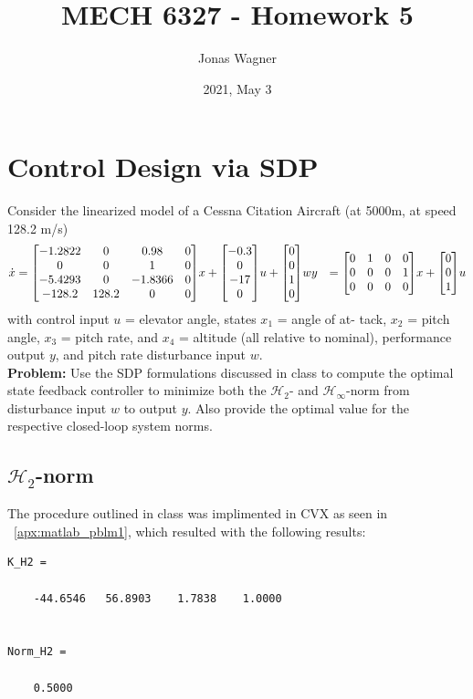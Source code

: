 \documentclass[letter]{article}
\title{MECH 6327 - Homework 5}
\author{Jonas Wagner}
\date{2021, May 3}
\begin{document}
\maketitle

\tableofcontents

\newpage
\section{Control Design via SDP}
Consider the linearized model of a Cessna Citation Aircraft (at 5000m, at speed 128.2 m/s)
\begin{equation}
	\begin{aligned}
		\dot{x} &= \mqty[-1.2822 & 0 & 0.98 &0\\
						 0 & 0 &1 &0\\
						 -5.4293 &0 &-1.8366 &0\\
						 -128.2 &128.2 &0 &0] x
				+ \mqty[-0.3\\ 0\\ -17\\ 0] u
				+ \mqty[0\\ 0\\ 1\\0]w
		y		&= \mqty[0&1&0&0\\ 0&0&0&1\\ 0&0&0&0] x
				+ \mqty[0\\0\\1]u	
	\end{aligned}
\end{equation}
with control input $u$ = elevator angle, states $x_1$ = angle of at-
tack, $x_2$ = pitch angle, $x_3$ = pitch rate, and $x_4$ = altitude (all
relative to nominal), performance output $y$, and pitch rate disturbance input $w$.\\

\noindent
\textbf{Problem:}
Use the SDP formulations discussed in class to compute the optimal state feedback controller to minimize both the $\mathcal{H}_2$- and $\mathcal{H}_\infty$-norm from disturbance input $w$ to output $y$.
Also provide the optimal value for the respective closed-loop system norms.

\subsection{$\mathcal{H}_2$-norm}
The procedure outlined in class was implimented in CVX as seen in \appendixname \ \ref{apx:matlab_pblm1}, which resulted with the following results:
\begin{Verbatim}
K_H2 =

	-44.6546   56.8903    1.7838    1.0000


Norm_H2 =

	0.5000
\end{Verbatim}
\end{document}
